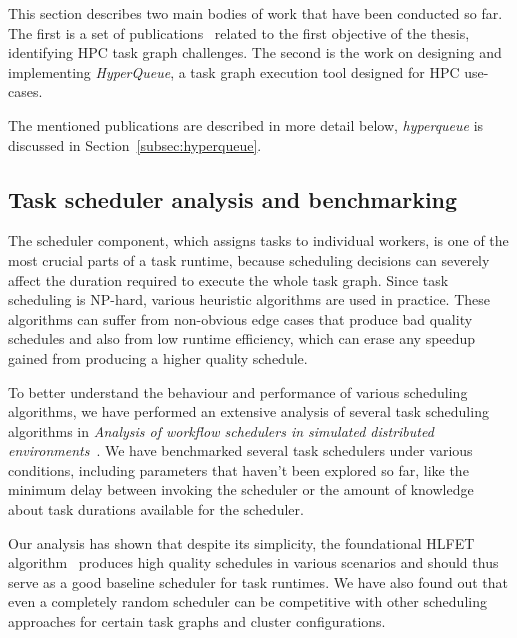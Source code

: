 This section describes two main bodies of work that have been conducted so far. The first is a
set of publications~\cite{estee, rsds,spin2,spin} related to the first objective of the thesis,
identifying HPC task graph challenges. The second is the work on designing and implementing
\emph{HyperQueue}, a task graph execution tool designed for HPC use-cases.

The mentioned publications are described in more detail below, \emph{hyperqueue} is discussed in
Section~\ref{subsec:hyperqueue}.

\subsection{Task scheduler analysis and benchmarking}
The scheduler component, which assigns tasks to individual workers, is one of the
most crucial parts of a task runtime, because scheduling decisions can severely affect the
duration required to execute the whole task graph. Since task scheduling is NP-hard, various
heuristic algorithms are used in practice. These algorithms can suffer from non-obvious edge cases
that produce bad quality schedules and also from low runtime efficiency, which can erase any
speedup gained from producing a higher quality schedule.

To better understand the behaviour and performance of various scheduling algorithms, we have
performed an extensive analysis of several task scheduling algorithms in
\emph{Analysis of workflow schedulers in simulated distributed environments}~\cite{estee}.
We have benchmarked several task schedulers under various conditions, including parameters that
haven't been explored so far, like the minimum delay between invoking the
scheduler or the amount of knowledge about task durations available for the scheduler.

Our analysis has shown that despite its simplicity, the foundational HLFET
algorithm~\cite{hlfet1974} produces high quality schedules in various scenarios and should thus
serve as a good baseline scheduler for task runtimes. We have also found out that even a
completely random scheduler can be competitive with other scheduling approaches for certain task
graphs and cluster configurations.


